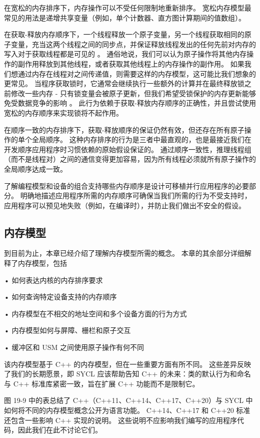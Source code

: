 在宽松的内存排序下，内存操作可以不受任何限制地重新排序。 宽松内存模型最常见的用法是递增共享变量（例如，单个计数器、直方图计算期间的值数组）。

在获取-释放内存顺序下，一个线程释放一个原子变量，另一个线程获取相同的原子变量，充当这两个线程之间的同步点，并保证释放线程发出的任何先前对内存的写入对于获取线程都是可见的 。 通俗地说，我们可以认为原子操作将其他内存操作的副作用释放到其他线程，或者获取其他线程上的内存操作的副作用。 如果我们想通过内存在线程对之间传递值，则需要这样的内存模型，这可能比我们想象的更常见。 当程序获取锁时，它通常会继续执行一些额外的计算并在最终释放锁之前修改一些内存 - 只有锁变量会被原子更新，但我们希望受锁保护的内存更新能够免受数据竞争的影响 。 此行为依赖于获取-释放内存顺序的正确性，并且尝试使用宽松的内存顺序来实现锁将不起作用。

在顺序一致的内存排序下，获取-释放顺序的保证仍然有效，但还存在所有原子操作的单个全局顺序。 这种内存排序的行为是三者中最直观的，也是最接近我们在开发顺序应用程序时习惯依赖的原始假设保证的。 通过顺序一致性，推理线程组（而不是线程对）之间的通信变得更加容易，因为所有线程必须就所有原子操作的全局顺序达成一致。

了解编程模型和设备的组合支持哪些内存顺序是设计可移植并行应用程序的必要部分。 明确地描述应用程序所需的内存顺序可确保当我们所需的行为不受支持时，应用程序可以预见地失败（例如，在编译时），并防止我们做出不安全的假设。

\subsection{内存模型}
到目前为止，本章已经介绍了理解内存模型所需的概念。 本章的其余部分详细解释了内存模型，包括

• 如何表达内核的内存排序要求

• 如何查询特定设备支持的内存顺序

• 内存模型在不相交的地址空间和多个设备方面的行为方式

• 内存模型如何与屏障、栅栏和原子交互

• 缓冲区和 USM 之间使用原子操作有何不同

该内存模型基于 C++ 的内存模型，但在一些重要方面有所不同。 这些差异反映了我们的长期愿景，即 SYCL 应该帮助告知 C++ 的未来：类的默认行为和命名与 C++ 标准库紧密一致，旨在扩展 C++ 功能而不是限制它。

图 19-9 中的表总结了 C++（C++11、C++14、C++17、C++20）与 SYCL 中如何将不同的内存模型概念公开为语言功能。 C++14、C++17 和 C++20 标准还包含一些影响 C++ 实现的说明。 这些说明不应影响我们编写的应用程序代码，因此我们在此不讨论它们。

